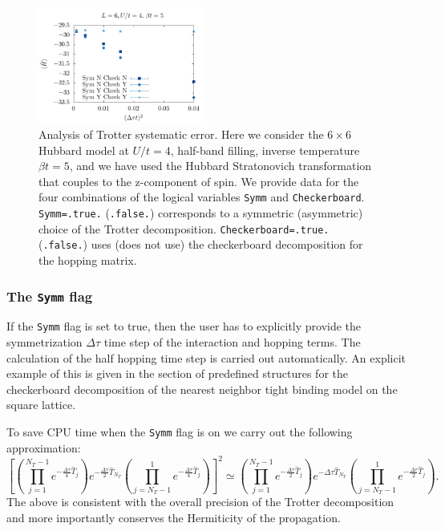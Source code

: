 \begin{figure}
\center
\includegraphics[width=0.49\textwidth]{Figures/Dtau/Dtau.pdf}

        \caption{Analysis of  Trotter systematic error.  Here we consider the $6\times 6$ Hubbard model at $U/t=4$, half-band filling,  inverse temperature $\beta t =5$, and we have used the Hubbard Stratonovich transformation that couples to the z-component of spin.     We provide data for the four combinations of  the logical variables \texttt{Symm}  and \texttt{Checkerboard}.   \texttt{Symm=.true.}    (\texttt{.false.})  corresponds to a symmetric  (asymmetric) choice  of the Trotter decomposition.  \texttt{Checkerboard=.true.}  (\texttt{.false.})   uses (does not use) the  checkerboard   decomposition  for the hopping  matrix. 
  }
        \label{Trotter.fig}
\end{figure}


\subsubsection{ The \texttt{Symm}   flag  } 

If the  \texttt{Symm}  flag is set to true, then the user has to   explicitly  provide the  symmetrization  $\Delta \tau$ time step  of the interaction and 
hopping terms.     The   calculation of the half  hopping   time step is carried out automatically.   
An explicit example of this is given in the  section of predefined structures  for  the checkerboard decomposition of the  nearest neighbor tight binding model on the square lattice. 

To save CPU time  when the \texttt{Symm}  flag is on  we  carry out the following   approximation:
\begin{equation}
	\left[  
	  \left(\prod_{j=1}^{N_T-1} e^{-\frac{\Delta \tau}{4} \hat{T}_j } \right)    e^{-\frac{\Delta \tau}{2} \hat{T}_{N_T} }    
   \left(  \prod_{j=N_T-1}^{1} e^{-\frac{\Delta \tau}{4} \hat{T}_j } \right)      \right]^2   \simeq
	  \left(\prod_{j=1}^{N_T-1} e^{-\frac{\Delta \tau}{2} \hat{T}_j } \right)    e^{-\Delta \tau\hat{T}_{N_T} }    
   \left(  \prod_{j=N_T-1}^{1} e^{-\frac{\Delta \tau}{2} \hat{T}_j } \right).   
\end{equation}
The above  is consistent with the overall precision of the Trotter decomposition and more importantly  conserves the Hermiticity of the propagation. 
